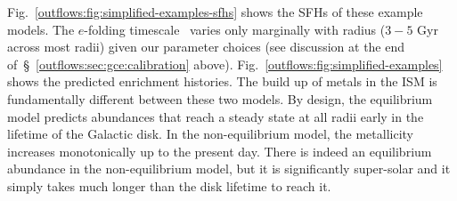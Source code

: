 Fig.~\ref{outflows:fig:simplified-examples-sfhs} shows the SFHs of these
example models.
The $e$-folding timescale~ varies only marginally with radius
($3 - 5$ Gyr across most radii) given our parameter choices (see discussion
at the end of~\S~\ref{outflows:sec:gce:calibration} above).
Fig.~\ref{outflows:fig:simplified-examples} shows the predicted enrichment
histories.
The build up of metals in the ISM is fundamentally different between these two
models.
By design, the equilibrium model predicts abundances that reach a steady
state at all radii early in the lifetime of the Galactic disk.
In the non-equilibrium model, the metallicity increases monotonically up to the
present day.
There is indeed an equilibrium abundance in the non-equilibrium model, but it
is significantly super-solar and it simply takes much longer than the disk
lifetime to reach it.

